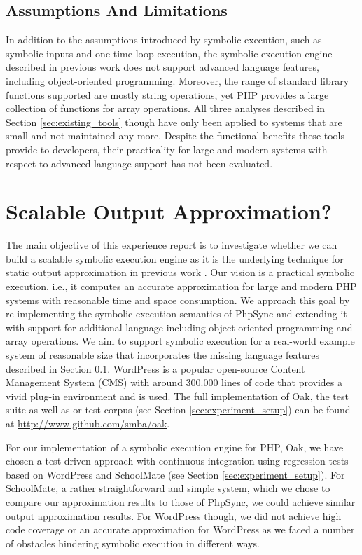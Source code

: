 \documentclass[sigconf]{acmart}
\renewcommand{\sf}[1]{\textsf{#1}}
\begin{document}
\subsection{Assumptions And Limitations}\label{sec:limitations}
In addition to the assumptions introduced by symbolic execution, such as
symbolic inputs and one-time loop execution, the symbolic execution
engine described in previous work \cite{Nguyen:2014:BCG:2635868.2635928} does
not support advanced language features, including object-oriented programming. Moreover, the range of
standard library functions supported are mostly string operations, yet PHP
provides a large collection of functions for array operations.
All three analyses described in Section \ref{sec:existing_tools} though have
only been applied to systems that are small and not maintained any more. Despite the
functional benefits these tools provide to developers, their practicality for
large and modern systems with respect to advanced language support has not been
evaluated.

\section{Scalable Output Approximation?} \label{sec:3}
The main objective of this experience report is to investigate whether we can
build a scalable symbolic execution engine as it is the underlying technique
for static output approximation in previous work
\cite{Nguyen:2011:AFH:2190078.2190142,Nguyen:2014:BCG:2635868.2635928,Nguyen:2015:CPS:2786805.2786872,Nguyen:2015:VIS:2819009.2819140}.
Our vision is a practical symbolic execution, i.e., it computes an accurate
approximation for large and modern PHP systems with reasonable time and space consumption.
We approach this goal by re-implementing the symbolic execution semantics  of
\sf{PhpSync} \cite{Nguyen:2014:BCG:2635868.2635928} and extending it with support for additional language
including object-oriented programming and array operations. We aim to support symbolic
execution for a real-world example system of reasonable size that incorporates
the missing language features described in Section \ref{sec:limitations}.
\textsf{WordPress} is a popular open-source Content Management System (CMS)
with around 300.000 lines of code that provides a vivid
plug-in environment and is used.  The full implementation of \sf{Oak}, the test
suite as well as or test corpus (see Section \ref{sec:experiment_setup}) can be found at
\url{http://www.github.com/smba/oak}.

For our implementation of a symbolic execution engine for PHP, Oak, we have
chosen a test-driven approach with continuous integration using regression
tests based on \sf{WordPress} and \sf{SchoolMate} (see Section
\ref{sec:experiment_setup}). For \sf{SchoolMate}, a rather straightforward and
simple system, which we chose to compare our approximation results to those of
\sf{PhpSync}, we could achieve similar output approximation results. For
\sf{WordPress} though, we did not achieve high code coverage or an accurate
approximation for \sf{WordPress} as we faced a number of obstacles hindering
symbolic execution in different ways.
\end{document}
